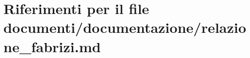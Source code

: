 \hypertarget{relazione__fabrizi_8md}{}\section{Riferimenti per il file documenti/documentazione/relazione\+\_\+fabrizi.md}
\label{relazione__fabrizi_8md}
